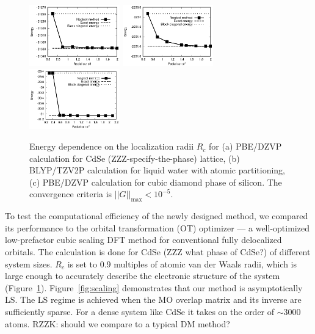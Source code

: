 \documentclass[aps,prl,twocolumn,reprint,amsmath,amssymb]{revtex4-1}
\begin{document}
\begin{figure}
\centering
\includegraphics[width=0.35\textwidth]{CdSe}
\includegraphics[width=0.35\textwidth]{H2O}
\includegraphics[width=0.35\textwidth]{Si}
\caption{Energy dependence on the localization radii $R_c$ for (a) PBE/DZVP calculation for CdSe (ZZZ-specify-the-phase) lattice, (b) BLYP/TZV2P calculation for liquid water with atomic partitioning, (c) PBE/DZVP calculation for cubic diamond phase of silicon. The convergence criteria is $\vert\vert G\vert\vert_{\text{max}} < 10^{-5}$.}
\label{fig:accuracy}
\end{figure}

\label{marker:performance}To test the computational efficiency of the newly designed method, we compared its performance to the orbital transformation (OT) optimizer \cite{weber2008direct,vandevondele2003efficient} --- a well-optimized low-prefactor cubic scaling DFT method for conventional fully delocalized orbitals. The calculation is done for CdSe (ZZZ what phase of CdSe?) of different system sizes. $R_c$ is set to 0.9 multiples of atomic van der Waals radii, which is large enough to accurately describe the electronic structure of the system (Figure~\ref{fig:accuracy}). Figure~\ref{fig:scaling} demonstrates that our method is asymptotically LS. The LS regime is achieved when the MO overlap matrix and its inverse are sufficiently sparse. For a dense system like CdSe it takes on the order of $\sim$3000 atoms. RZZK: should we compare to a typical DM method?
\end{document}
